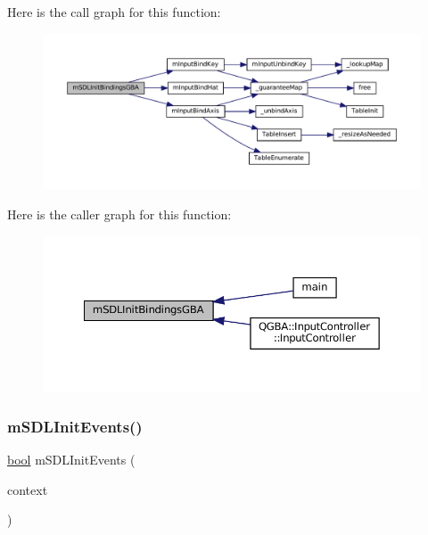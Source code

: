 Here is the call graph for this function\+:
\nopagebreak
\begin{figure}[H]
\begin{center}
\leavevmode
\includegraphics[width=350pt]{sdl-events_8c_a254830bd4cde57bec6bf2dade355902f_cgraph}
\end{center}
\end{figure}
Here is the caller graph for this function\+:
\nopagebreak
\begin{figure}[H]
\begin{center}
\leavevmode
\includegraphics[width=350pt]{sdl-events_8c_a254830bd4cde57bec6bf2dade355902f_icgraph}
\end{center}
\end{figure}
\mbox{\label{sdl-events_8c_a0529db4419b332c04fea23fff2467774}} 
\subsubsection{\texorpdfstring{m\+S\+D\+L\+Init\+Events()}{mSDLInitEvents()}}
{\footnotesize\ttfamily \mbox{\hyperlink{libretro_8h_a4a26dcae73fb7e1528214a068aca317e}{bool}} m\+S\+D\+L\+Init\+Events (\begin{DoxyParamCaption}\item[{struct \mbox{\hyperlink{sdl-events_8h_structm_s_d_l_events}{m\+S\+D\+L\+Events}} $\ast$}]{context }\end{DoxyParamCaption})}


